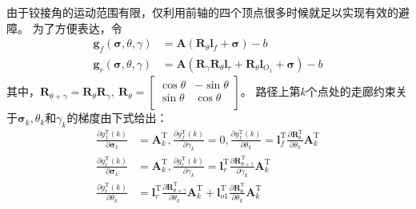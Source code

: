 \documentclass[master,academic]{ysuthesis} %
\begin{document}
		由于铰接角的运动范围有限，仅利用前轴的四个顶点很多时候就足以实现有效的避障。
		为了方便表达，令
		\begin{equation}
			\begin{aligned}
			\bm{g}_{f}\left( \bm{\sigma} ,\theta ,\gamma \right) &=\bm{A}\left( \bm{R}_{\theta}\bm{l}_f+\bm{\sigma} \right) -b\\
			\bm{g}_r\left( \bm{\sigma} ,\theta ,\gamma \right) &=\bm{A}\left( \bm{R}_{\gamma}\bm{R}_{\theta}\bm{l}_r+\bm{R}_{\theta}\bm{l}_{O_1}+\bm{\sigma} \right) -b
			\end{aligned}
		\end{equation}
		其中，$\bm{R}_{\theta +\gamma}=\bm{R}_{\theta}\bm{R}_{\gamma},\ \bm{R}_{\theta}=\left[ \begin{matrix}
			\cos\theta&		-\sin\theta\\
			\sin\theta&		\cos\theta\\
		\end{matrix} \right] $。
		路径上第$k$个点处的走廊约束关于$\bm{\sigma}_k,\theta_k$和$\gamma_k$的梯度由下式给出：
		\begin{equation}
			\begin{aligned}
			\frac{\partial g_{f}^{\mathrm{T}}(k)}{\partial \bm{\sigma} _k}&=\bm{A}_{k}^{\mathrm{T}},\frac{\partial g_{f}^{\mathrm{T}}(k)}{\partial \gamma _k}=0,\frac{\partial g_{f}^{\mathrm{T}}(k)}{\partial \theta _k}=\bm{l}_{f}^{\mathrm{T}}\frac{\partial \bm{R}_{\theta}^{\mathrm{T}}}{\partial \theta _k}\bm{A}_{k}^{\mathrm{T}}\\
			\frac{\partial g_{r}^{\mathrm{T}}(k)}{\partial \bm{\sigma} _k}&=\bm{A}_{k}^{\mathrm{T}},\frac{\partial g_{r}^{\mathrm{T}}(k)}{\partial \gamma _k}=\bm{l}_{r}^{\mathrm{T}}\frac{\partial \bm{R}_{\theta +\gamma}^{\mathrm{T}}}{\partial \gamma _k}\bm{A}_{k}^{\mathrm{T}}\\
			\frac{\partial g_{r}^{\mathrm{T}}(k)}{\partial \theta _k}&=\bm{l}_{r}^{\mathrm{T}}\frac{\partial \bm{R}_{\theta +\gamma}^{\mathrm{T}}}{\partial \theta _k}\bm{A}_{k}^{\mathrm{T}}+\bm{l}_{o1}^{\mathrm{T}}\frac{\partial \bm{R}_{\theta}^{\mathrm{T}}}{\partial \theta _k}\bm{A}_{k}^{\mathrm{T}}
			\end{aligned}
		\end{equation}
\end{document}

